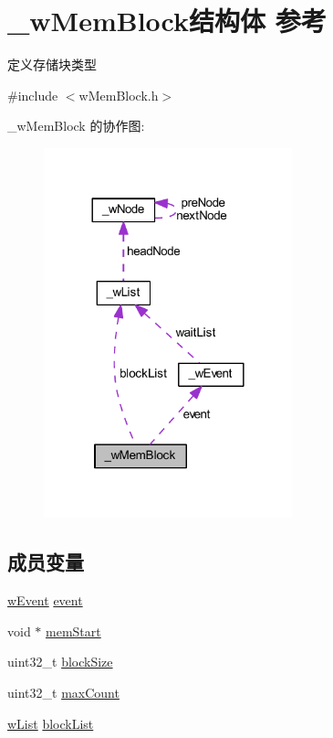 \hypertarget{struct__w_mem_block}{}\section{\+\_\+w\+Mem\+Block结构体 参考}
\label{struct__w_mem_block}


定义存储块类型  




{\ttfamily \#include $<$w\+Mem\+Block.\+h$>$}



\+\_\+w\+Mem\+Block 的协作图\+:
\nopagebreak
\begin{figure}[H]
\begin{center}
\leavevmode
\includegraphics[width=204pt]{struct__w_mem_block__coll__graph}
\end{center}
\end{figure}
\subsection*{成员变量}
\begin{DoxyCompactItemize}
\item 
\mbox{\hyperlink{w_event_8h_af8b15988a26e1ac0d63eaf3fc5afe9d3}{w\+Event}} \mbox{\hyperlink{struct__w_mem_block_ad737d3f95a5cf9ee457f37f1cedfa44a}{event}}
\item 
void $\ast$ \mbox{\hyperlink{struct__w_mem_block_a278e5d28605731490bb61cb8d313a5f3}{mem\+Start}}
\item 
uint32\+\_\+t \mbox{\hyperlink{struct__w_mem_block_ab6558f40a619c2502fbc24c880fd4fb0}{block\+Size}}
\item 
uint32\+\_\+t \mbox{\hyperlink{struct__w_mem_block_a1cc8a4ba5eee24b560f9869012941e91}{max\+Count}}
\item 
\mbox{\hyperlink{w_lib_8h_a3f922f977222a1e1fc18bd2ce6d668c3}{w\+List}} \mbox{\hyperlink{struct__w_mem_block_a2247091b4ceb8f63ff199b551bb3c352}{block\+List}}
\end{DoxyCompactItemize}


